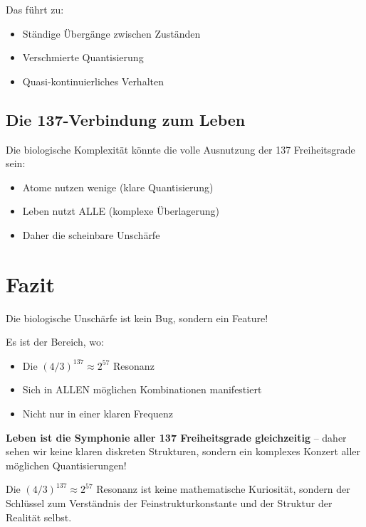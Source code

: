 	Das führt zu:
	\begin{itemize}
		\item Ständige Übergänge zwischen Zuständen
		\item Verschmierte Quantisierung
		\item Quasi-kontinuierliches Verhalten
	\end{itemize}
	
	\subsection{Die 137-Verbindung zum Leben}
	
	Die biologische Komplexität könnte die volle Ausnutzung der 137 Freiheitsgrade sein:
	\begin{itemize}
		\item Atome nutzen wenige (klare Quantisierung)
		\item Leben nutzt ALLE (komplexe Überlagerung)
		\item Daher die scheinbare Unschärfe
	\end{itemize}
	
	\section{Fazit}
	
	Die biologische Unschärfe ist kein Bug, sondern ein Feature! 
	
	Es ist der Bereich, wo:
	\begin{itemize}
		\item Die $(4/3)^{137} \approx 2^{57}$ Resonanz
		\item Sich in ALLEN möglichen Kombinationen manifestiert
		\item Nicht nur in einer klaren Frequenz
	\end{itemize}
	
	\textbf{Leben ist die Symphonie aller 137 Freiheitsgrade gleichzeitig} -- daher sehen wir keine klaren diskreten Strukturen, sondern ein komplexes Konzert aller möglichen Quantisierungen!
	
	Die $(4/3)^{137} \approx 2^{57}$ Resonanz ist keine mathematische Kuriosität, sondern der Schlüssel zum Verständnis der Feinstrukturkonstante und der Struktur der Realität selbst.
	
